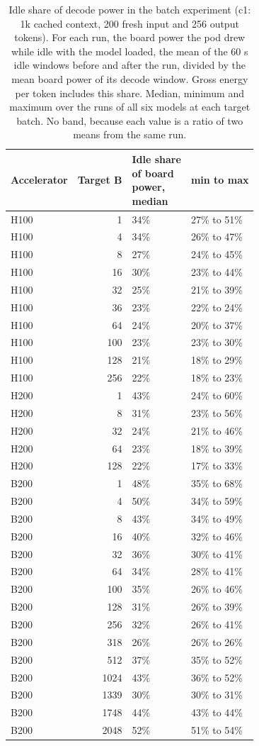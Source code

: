 \begin{table}[t]
\centering
\footnotesize
\setlength{\tabcolsep}{4pt}
\caption{Idle share of decode power in the batch experiment (c1: 1k cached context, 200 fresh input and 256 output tokens). For each run, the board power the pod drew while idle with the model loaded, the mean of the 60 s idle windows before and after the run, divided by the mean board power of its decode window. Gross energy per token includes this share. Median, minimum and maximum over the runs of all six models at each target batch. No band, because each value is a ratio of two means from the same run.}\label{tab:idle_share}
\begin{tabular}{lrll}
\toprule
Accelerator & Target B & \makecell[l]{Idle share\\of board\\power,\\median} & min to max \\
\midrule
H100 & 1 & 34\% & 27\% to 51\% \\
H100 & 4 & 34\% & 26\% to 47\% \\
H100 & 8 & 27\% & 24\% to 45\% \\
H100 & 16 & 30\% & 23\% to 44\% \\
H100 & 32 & 25\% & 21\% to 39\% \\
H100 & 36 & 23\% & 22\% to 24\% \\
H100 & 64 & 24\% & 20\% to 37\% \\
H100 & 100 & 23\% & 23\% to 30\% \\
H100 & 128 & 21\% & 18\% to 29\% \\
H100 & 256 & 22\% & 18\% to 23\% \\
H200 & 1 & 43\% & 24\% to 60\% \\
H200 & 8 & 31\% & 23\% to 56\% \\
H200 & 32 & 24\% & 21\% to 46\% \\
H200 & 64 & 23\% & 18\% to 39\% \\
H200 & 128 & 22\% & 17\% to 33\% \\
B200 & 1 & 48\% & 35\% to 68\% \\
B200 & 4 & 50\% & 34\% to 59\% \\
B200 & 8 & 43\% & 34\% to 49\% \\
B200 & 16 & 40\% & 32\% to 46\% \\
B200 & 32 & 36\% & 30\% to 41\% \\
B200 & 64 & 34\% & 28\% to 41\% \\
B200 & 100 & 35\% & 26\% to 46\% \\
B200 & 128 & 31\% & 26\% to 39\% \\
B200 & 256 & 32\% & 26\% to 41\% \\
B200 & 318 & 26\% & 26\% to 26\% \\
B200 & 512 & 37\% & 35\% to 52\% \\
B200 & 1024 & 43\% & 36\% to 52\% \\
B200 & 1339 & 30\% & 30\% to 31\% \\
B200 & 1748 & 44\% & 43\% to 44\% \\
B200 & 2048 & 52\% & 51\% to 54\% \\
\bottomrule
\end{tabular}
\end{table}
